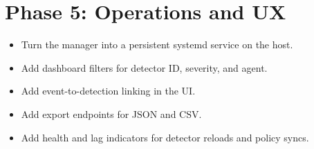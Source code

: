 \documentclass[
  12pt,
]{report}
\providecommand{\tightlist}{%
  \setlength{\itemsep}{0pt}\setlength{\parskip}{0pt}}
\begin{document}
\section{Phase 5: Operations and UX}\label{phase-5-operations-and-ux}

\begin{itemize}
\tightlist
\item
  Turn the manager into a persistent systemd service on the host.
\item
  Add dashboard filters for detector ID, severity, and agent.
\item
  Add event-to-detection linking in the UI.
\item
  Add export endpoints for JSON and CSV.
\item
  Add health and lag indicators for detector reloads and policy syncs.
\end{itemize}

\clearpage
\end{document}
